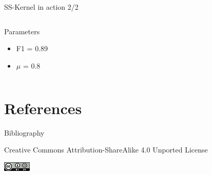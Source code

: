 \documentclass[10pt,aspectratio=1610,,color={dvipsnames,usenames,table},table]{beamer}
\begin{document}
\begin{frame}[label={sec:orga109bbe}]{SS-Kernel in action 2/2}
\begin{columns}
\begin{column}{0.3\columnwidth}
\begin{block}{Parameters}
\begin{itemize}
\item F1 = 0.89
\item \(\mu\) = 0.8
\end{itemize}
\end{block}
\end{column}
\end{columns}
\end{frame}

\section{References}
\label{sec:orge2566b3}
\begin{frame}[fragile,allowframebreaks,label=]{Bibliography}
\printbibliography
\end{frame}
\begin{frame}[label={sec:org0cba7c6}]{}
\begin{center}
\tiny Creative Commons Attribution-ShareAlike 4.0 Unported License
\normalsize

\begin{center}
\includegraphics[width=0.1\textwidth]{figures/cc-by-sa.png}
\end{center}
\end{center}
\end{frame}
\end{document}
